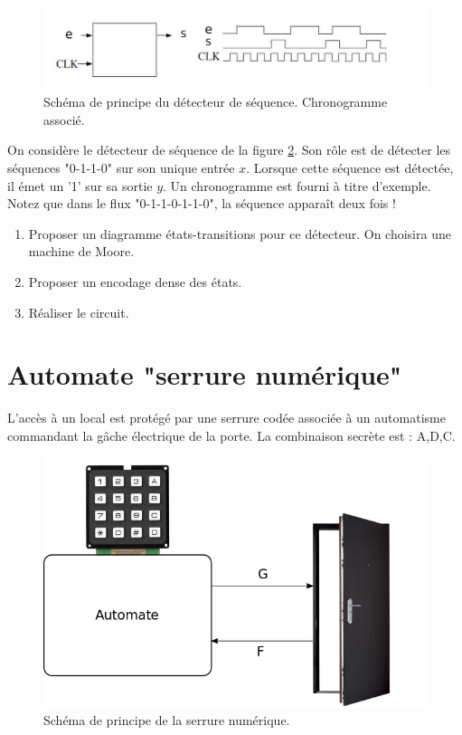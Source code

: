 \documentclass[a4paper,11pt]{article}
\begin{document}
\begin{figure}[!h]
  \begin{center}
    \includegraphics[scale=0.3]{./figures/exo2}
  \end{center}
  \caption{Schéma de principe du détecteur de séquence. Chronogramme associé.}
  \label{exo2}
\end{figure}

On considère le détecteur de séquence de la figure \ref{exo2}. Son rôle est de détecter les séquences "0-1-1-0" sur son unique entrée $x$.
Lorsque cette séquence est détectée, il émet un '1' sur sa sortie $y$. Un chronogramme est fourni à titre d'exemple. Notez que dans le flux
"0-1-1-0-1-1-0", la séquence apparaît deux fois !
\begin{enumerate}
  \item Proposer un diagramme états-transitions pour ce détecteur. On choisira une machine de Moore.
  \item Proposer un encodage dense des états.
  \item Réaliser le circuit.
\end{enumerate}

\section{Automate "serrure numérique"}
L’accès à un local est protégé par une serrure codée associée à un
automatisme commandant la gâche électrique de la porte. La combinaison secrète est : A,D,C.

\begin{figure}[!h]
  \begin{center}
    \includegraphics[scale=0.3]{./figures/porte.png}
  \end{center}
  \caption{Schéma de principe de la serrure numérique.}
  \label{exo2}
\end{figure}
\end{document}
